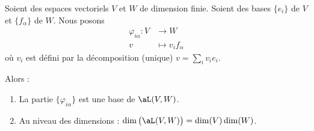 \begin{lemma}       \label{LEMooJXFIooKDzRWR}
    Soient des espaces vectoriels \( V\) et \( W\) de dimension finie. Soient des bases \( \{e_i\}\) de \( V\) et \( \{f_{\alpha}\}\) de \( W\). Nous posons
    \begin{equation}
        \begin{aligned}
            \varphi_{i\alpha}\colon V&\to W \\
            v&\mapsto v_if_{\alpha} 
        \end{aligned}
    \end{equation}
    où \( v_i\) est défini par la décomposition (unique) \( v=\sum_iv_ie_i\). 

    Alors :
    \begin{enumerate}
        \item
            La partie \( \{\varphi_{i\alpha}\} \) est une base de \( \aL(V,W)\).
        \item       \label{ITEMooPMLWooNbTyJI}
            Au niveau des dimensions : \( \dim\big( \aL(V,W) \big)=\dim(V)\dim(W)\).
    \end{enumerate}
\end{lemma}

